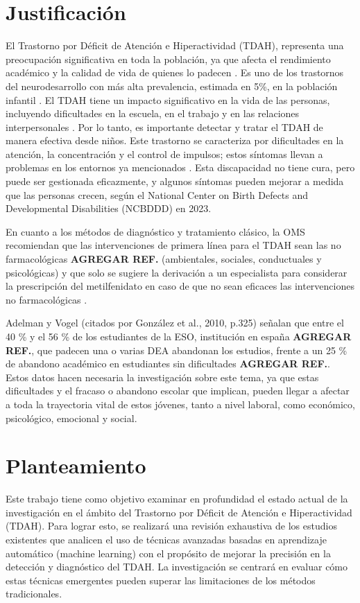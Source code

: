 \documentclass[10pt,journal,compsoc]{IEEEtran}
\begin{document}
\section{Justificación}
El Trastorno por Déficit de Atención e Hiperactividad (TDAH), representa una preocupación significativa en toda la población, ya que afecta el rendimiento académico y la calidad de vida de quienes lo padecen \cite{aparicio2024tecnologias}. Es uno de los trastornos del neurodesarrollo con más alta prevalencia, estimada en 5\%, en la población infantil \cite{boechi2023tecnologias}. El TDAH tiene un impacto significativo en la vida de las personas, incluyendo dificultades en la escuela, en el trabajo y en las relaciones interpersonales \cite{rivera2016elevada}. Por lo tanto, es importante detectar y tratar el TDAH de manera efectiva desde niños. Este trastorno se caracteriza por dificultades en la atención, la concentración y el control de impulsos; estos síntomas llevan a problemas en los entornos ya mencionados \cite{santarrosaanalisis}. Esta discapacidad no tiene cura, pero puede ser gestionada eficazmente, y algunos síntomas pueden mejorar a medida que las personas crecen, según el National Center on Birth Defects and Developmental Disabilities (NCBDDD) en 2023.

En cuanto a los métodos de diagnóstico y tratamiento clásico, la OMS recomiendan que las intervenciones de primera línea para el TDAH sean las no farmacológicas \textbf{AGREGAR REF.} (ambientales, sociales, conductuales y psicológicas) y que solo se sugiere la derivación a un especialista para considerar la prescripción del metilfenidato en caso de que no sean eficaces las intervenciones no farmacológicas \cite{boechi2023tecnologias}.

Adelman y Vogel (citados por González et al., 2010, p.325) señalan que entre el 40 \% y el 56 \% de los estudiantes de la ESO, institución en españa \textbf{AGREGAR REF.}, que padecen una o varias DEA abandonan los estudios, frente a un 25 \% de abandono académico en estudiantes sin dificultades \textbf{AGREGAR REF.}. Estos datos hacen necesaria la investigación sobre este tema, ya que estas dificultades y el fracaso o abandono escolar que implican, pueden llegar a afectar a toda la trayectoria vital de estos jóvenes, tanto a nivel laboral, como económico, psicológico, emocional y social.

\section{Planteamiento}
Este trabajo tiene como objetivo examinar en profundidad el estado actual de la investigación en el ámbito del Trastorno por Déficit de Atención e Hiperactividad (TDAH). Para lograr esto, se realizará una revisión exhaustiva de los estudios existentes que analicen el uso de técnicas avanzadas basadas en aprendizaje automático (machine learning) con el propósito de mejorar la precisión en la detección y diagnóstico del TDAH. La investigación se centrará en evaluar cómo estas técnicas emergentes pueden superar las limitaciones de los métodos tradicionales.
\end{document}
